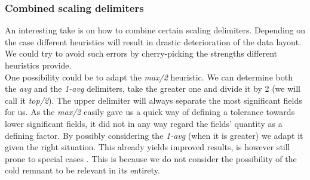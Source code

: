 \subsubsection{Combined scaling delimiters}
An interesting take is on how to combine certain scaling delimiters. Depending on the case different heuristics will result in drastic deterioration of the data layout. We could try to avoid such errors by cherry-picking the strengths different heuristics provide.\\
One possibility could be to adapt the \textit{max/2} heuristic. We can determine both the \textit{avg} and the \textit{1-avg} delimiters, take the greater one and divide it by 2 (we will call it \textit{top/2}). The upper delimiter will always separate the most significant fields for us. As the \textit{max/2} easily gave us a quick way of defining a tolerance towards lower significant fields, it did not in any way regard the fields' quantity as a defining factor. By possibly considering the \textit{1-avg} (when it is greater) we adapt it given the right situation. This already yields improved results, is however still prone to special cases . This is because we do not consider the possibility of the cold remnant to be relevant in its entirety.
